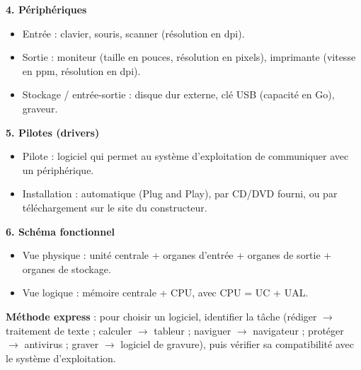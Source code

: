 \documentclass[11pt]{article}
\newcommand{\cle}[1]{{\popxbold\color{popdark}#1}}
\begin{document}
\begin{bilan}
\textbf{4. Périphériques}
\begin{itemize}
  \item \cle{Entrée} : clavier, souris, scanner (résolution en dpi).
  \item \cle{Sortie} : moniteur (taille en pouces, résolution en pixels), imprimante (vitesse en ppm, résolution en dpi).
  \item \cle{Stockage / entrée-sortie} : disque dur externe, clé USB (capacité en Go), graveur.
\end{itemize}

\textbf{5. Pilotes (drivers)}
\begin{itemize}
  \item \cle{Pilote} : logiciel qui permet au système d'exploitation de communiquer avec un périphérique.
  \item Installation : automatique (Plug and Play), par CD/DVD fourni, ou par téléchargement sur le site du constructeur.
\end{itemize}

\textbf{6. Schéma fonctionnel}
\begin{itemize}
  \item \cle{Vue physique} : unité centrale + organes d'entrée + organes de sortie + organes de stockage.
  \item \cle{Vue logique} : mémoire centrale + CPU, avec CPU = UC + UAL.
\end{itemize}

\textbf{Méthode express} : pour choisir un logiciel, identifier la tâche (rédiger $\rightarrow$ traitement de texte ; calculer $\rightarrow$ tableur ; naviguer $\rightarrow$ navigateur ; protéger $\rightarrow$ antivirus ; graver $\rightarrow$ logiciel de gravure), puis vérifier sa compatibilité avec le système d'exploitation.
\end{bilan}
\end{document}
